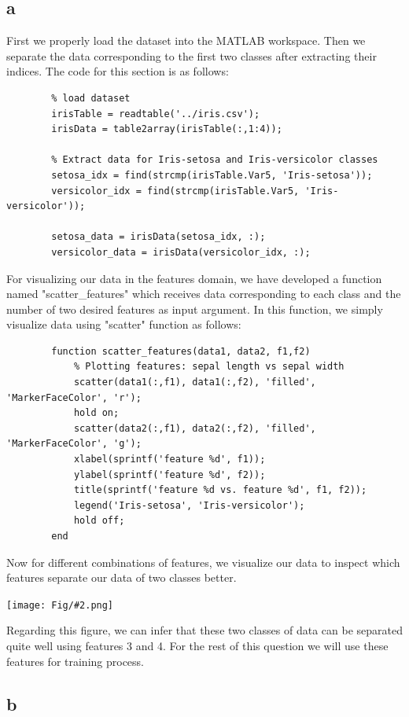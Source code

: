 \documentclass[]{article}
\newcommand{\pict}[2]{\begin{center}
		\texttt{[image: Fig/\#2.png]}
\end{center}}
\begin{document}
	\subsection*{a}
	First we properly load the dataset into the MATLAB workspace. Then we separate the data corresponding to the first two classes after extracting their indices. The code for this section is as follows:
	\begin{lstlisting}
		% load dataset
		irisTable = readtable('../iris.csv');
		irisData = table2array(irisTable(:,1:4));
		
		% Extract data for Iris-setosa and Iris-versicolor classes
		setosa_idx = find(strcmp(irisTable.Var5, 'Iris-setosa'));
		versicolor_idx = find(strcmp(irisTable.Var5, 'Iris-versicolor'));
		
		setosa_data = irisData(setosa_idx, :);
		versicolor_data = irisData(versicolor_idx, :);
	\end{lstlisting}
	For visualizing our data in the features domain, we have developed a function named "scatter\_features" which receives data corresponding to each class and the number of two desired features as input argument. In this function, we simply visualize data using "scatter" function as follows:
	\begin{lstlisting}
		function scatter_features(data1, data2, f1,f2)
			% Plotting features: sepal length vs sepal width
			scatter(data1(:,f1), data1(:,f2), 'filled', 'MarkerFaceColor', 'r');
			hold on;
			scatter(data2(:,f1), data2(:,f2), 'filled', 'MarkerFaceColor', 'g');
			xlabel(sprintf('feature %d', f1));
			ylabel(sprintf('feature %d', f2));
			title(sprintf('feature %d vs. feature %d', f1, f2));
			legend('Iris-setosa', 'Iris-versicolor');
			hold off;
		end
	\end{lstlisting}
	Now for different combinations of features, we visualize our data to inspect which features separate our data of two classes better.
	\pict{0.9}{Q2_F1}
	Regarding this figure, we can infer that these two classes of data can be separated quite well using features 3 and 4. For the rest of this question we will use these features for training process.
	
	\subsection*{b}
	
	
\end{document}
